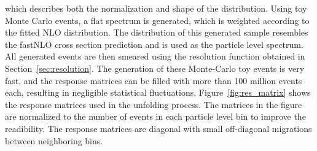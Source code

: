 which describes both the normalization and shape of the distribution. Using toy
Monte Carlo events, a flat \ptavg spectrum is generated, which is weighted
according to the fitted NLO distribution. The distribution of this generated
sample resembles the fastNLO cross section prediction and is used as the
particle level \ptavg spectrum. All generated events are then smeared using the
resolution function obtained in Section~\ref{sec:resolution}. The generation of
these Monte-Carlo toy events is very fast, and the response matrices can be
filled with more than 100 million events each, resulting in negligible statistical
fluctuations. Figure~\ref{fig:res_matrix} shows the response matrices used in
the unfolding process. The matrices in the figure are normalized to the number
of events in each particle level bin to improve the readibility. The response
matrices are diagonal with small off-diagonal migrations between neighboring
\ptavg bins.

